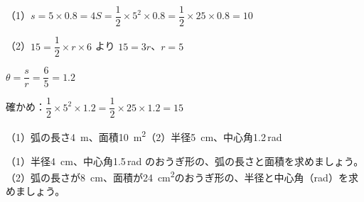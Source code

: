 \begin{reidai}
\shiki （1）$s=5\times0.8=4$\qquad $S=\dfrac{1}{2}\times5^2\times0.8=\dfrac{1}{2}\times25\times0.8=10$\par
\hspace*{2.6\zw}（2）$15=\dfrac{1}{2}\times r\times6$ より $15=3r$、$r=5$\par
\hspace*{4.3\zw}$\theta=\dfrac{s}{r}=\dfrac{6}{5}=1.2$\par
\hspace*{4.3\zw}確かめ：$\dfrac{1}{2}\times5^2\times1.2=\dfrac{1}{2}\times25\times1.2=15$\par
\kotae （1）\nobreak 弧の長さ\qty{4}{m}、面積\qty{10}{m^2}\quad（2）\nobreak 半径\qty{5}{cm}、中心角1.2\,rad
\end{reidai}

\begin{jibun}
（1）\nobreak 半径\qty{4}{cm}、中心角1.5\,rad のおうぎ形の、弧の長さと面積を求めましょう。（2）\nobreak 弧の長さが\qty{8}{cm}、面積が\qty{24}{cm^2}のおうぎ形の、半径と中心角（rad）を求めましょう。
\end{jibun}

